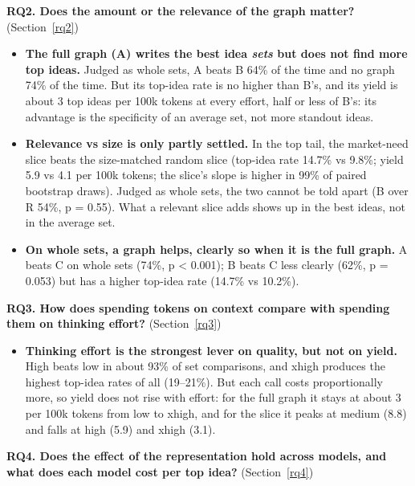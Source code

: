 \textbf{RQ2. Does the amount or the relevance of the graph matter?} (Section~\ref{rq2})

\begin{itemize}
\tightlist
\item
  \textbf{The full graph (A) writes the best idea \emph{sets} but does not find more top ideas.} Judged as whole sets, A beats B 64\% of the time and no graph 74\% of the time. But its top-idea rate is no higher than B's, and its yield is about 3 top ideas per 100k tokens at every effort, half or less of B's: its advantage is the specificity of an average set, not more standout ideas.
\item
  \textbf{Relevance vs size is only partly settled.} In the top tail, the market-need slice beats the size-matched random slice (top-idea rate 14.7\% vs 9.8\%; yield 5.9 vs 4.1 per 100k tokens; the slice's slope is higher in 99\% of paired bootstrap draws). Judged as whole sets, the two cannot be told apart (B over R 54\%, p = 0.55). What a relevant slice adds shows up in the best ideas, not in the average set.
\item
  \textbf{On whole sets, a graph helps, clearly so when it is the full graph.} A beats C on whole sets (74\%, p \textless{} 0.001); B beats C less clearly (62\%, p = 0.053) but has a higher top-idea rate (14.7\% vs 10.2\%).
\end{itemize}

\textbf{RQ3. How does spending tokens on context compare with spending them on thinking effort?} (Section~\ref{rq3})


\begin{itemize}
\tightlist
\item
  \textbf{Thinking effort is the strongest lever on quality, but not on yield.} High beats low in about 93\% of set comparisons, and xhigh produces the highest top-idea rates of all (19--21\%). But each call costs proportionally more, so yield does not rise with effort: for the full graph it stays at about 3 per 100k tokens from low to xhigh, and for the slice it peaks at medium (8.8) and falls at high (5.9) and xhigh (3.1).
\end{itemize}


\textbf{RQ4. Does the effect of the representation hold across models, and what does each model cost per top idea?} (Section~\ref{rq4})

